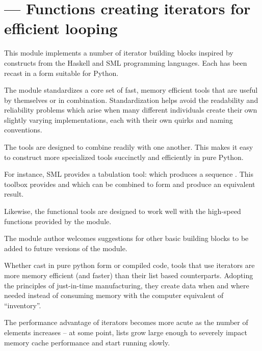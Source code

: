 \section{ ---
         Functions creating iterators for efficient looping}



This module implements a number of iterator building blocks inspired
by constructs from the Haskell and SML programming languages.  Each
has been recast in a form suitable for Python.

The module standardizes a core set of fast, memory efficient tools
that are useful by themselves or in combination.  Standardization helps
avoid the readability and reliability problems which arise when many
different individuals create their own slightly varying implementations,
each with their own quirks and naming conventions.

The tools are designed to combine readily with one another.  This makes
it easy to construct more specialized tools succinctly and efficiently
in pure Python.

For instance, SML provides a tabulation tool: 
which produces a sequence .  This toolbox
provides  and  which can be combined
to form  and produce an equivalent result.

Likewise, the functional tools are designed to work well with the
high-speed functions provided by the  module.

The module author welcomes suggestions for other basic building blocks
to be added to future versions of the module.

Whether cast in pure python form or compiled code, tools that use iterators
are more memory efficient (and faster) than their list based counterparts.
Adopting the principles of just-in-time manufacturing, they create
data when and where needed instead of consuming memory with the
computer equivalent of ``inventory''.

The performance advantage of iterators becomes more acute as the number
of elements increases -- at some point, lists grow large enough to
severely impact memory cache performance and start running slowly.

